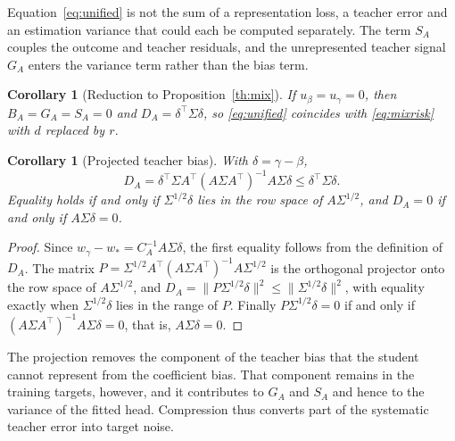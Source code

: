 \documentclass[11pt]{article}
\newtheorem{corollary}[theorem]{Corollary}
\theoremstyle{remark}
\newcommand{\1}{\mathbf 1}
\begin{document}
Equation~\eqref{eq:unified} is not the sum of a representation loss, a teacher error and an estimation variance that could each be computed separately. The term $S_A$ couples the outcome and teacher residuals, and the unrepresented teacher signal $G_A$ enters the variance term rather than the bias term.

\begin{corollary}[Reduction to Proposition~\ref{th:mix}]
If $u_\beta=u_\gamma=0$, then $B_A=G_A=S_A=0$ and $D_A=\delta^\top\Sigma\delta$, so \eqref{eq:unified} coincides with \eqref{eq:mixrisk} with $d$ replaced by $r$.
\end{corollary}

\begin{corollary}[Projected teacher bias]\label{cor:project}
With $\delta=\gamma-\beta$,
\begin{equation}\label{eq:projectbias}
 D_A=\delta^\top\Sigma A^\top (A\Sigma A^\top)^{-1}A\Sigma\delta
 \leq\delta^\top\Sigma\delta .
\end{equation}
Equality holds if and only if $\Sigma^{1/2}\delta$ lies in the row space of $A\Sigma^{1/2}$, and $D_A=0$ if and only if $A\Sigma\delta=0$.
\end{corollary}
\begin{proof}
Since $w_\gamma-w_*=C_A^{-1}A\Sigma\delta$, the first equality follows from the definition of $D_A$. The matrix $P=\Sigma^{1/2}A^\top(A\Sigma A^\top)^{-1}A\Sigma^{1/2}$ is the orthogonal projector onto the row space of $A\Sigma^{1/2}$, and $D_A=\|P\Sigma^{1/2}\delta\|^2\leq\|\Sigma^{1/2}\delta\|^2$, with equality exactly when $\Sigma^{1/2}\delta$ lies in the range of $P$. Finally $P\Sigma^{1/2}\delta=0$ if and only if $(A\Sigma A^\top)^{-1}A\Sigma\delta=0$, that is, $A\Sigma\delta=0$.
\end{proof}

The projection removes the component of the teacher bias that the student cannot represent from the coefficient bias. That component remains in the training targets, however, and it contributes to $G_A$ and $S_A$ and hence to the variance of the fitted head. Compression thus converts part of the systematic teacher error into target noise.
\end{document}

